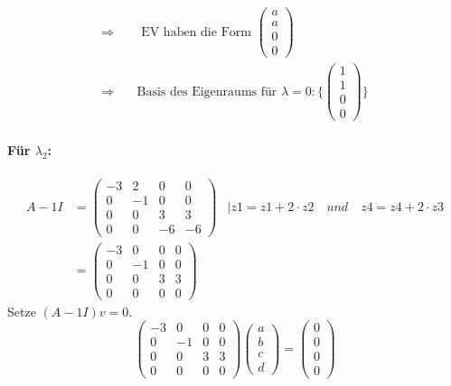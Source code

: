 \documentclass{article} %
\begin{document}
\begin{align*}
       \Rightarrow & \quad \text{ EV haben die Form } \begin{pmatrix}
         a \\ a \\ 0 \\ 0
      \end{pmatrix} \\
        \Rightarrow & \quad \text{Basis des Eigenraums für } \lambda = 0 : \Biggl\{ \begin{pmatrix}
         1 \\ 1 \\ 0 \\ 0
      \end{pmatrix}   \Biggr\} 
\end{align*}   
\paragraph{Für $\lambda_2$:}
\begin{align*}
       A - 1I &  = \begin{pmatrix}
    -3 & 2 &0 & 0\\ 
    0 &- 1 & 0 & 0 \\
    0 & 0 & 3  & 3 \\
    0 & 0 & -6 & -6
    \end{pmatrix} & \mid z1 = z1+ 2\cdot z2 \quad und  \quad z4 = z4 + 2\cdot z3\\
    & = \begin{pmatrix}
    -3 & 0 &0 & 0\\ 
    0 &- 1 & 0 & 0 \\
    0 & 0 & 3  & 3 \\
    0 & 0 & 0 & 0
    \end{pmatrix} 
\end{align*}
    Setze $ (A - 1I)v = 0$.
    \[   \begin{pmatrix}
    -3 & 0 & 0 &  0\\ 
    0 &- 1 & 0 & 0 \\
    0 & 0 & 3  & 3 \\
    0 & 0 & 0 & 0
    \end{pmatrix} \begin{pmatrix}
       a \\ b \\ c \\ d 
    \end{pmatrix}  = \begin{pmatrix}
       0 \\ 0 \\0 \\ 0
    \end{pmatrix} \]
\end{document}
